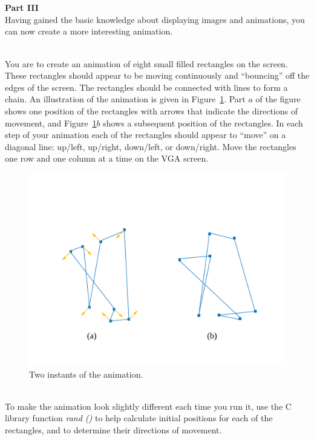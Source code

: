 \documentclass[epsfig,10pt,fullpage]{article}
\begin{document}
~\\
~\\
\noindent
{\bf Part III}
~\\

\noindent
Having gained the basic knowledge about displaying images and animations, you can now create 
a more interesting animation.

~\\
\noindent
You are to create an animation of eight small filled rectangles on the screen. These rectangles 
should appear to be moving continuously and ``bouncing'' off the edges of the screen. The 
rectangles should be connected with lines to form a chain. An illustration of the animation 
is given in Figure~\ref{fig:animation_example}. Part $a$ of the figure shows one position
of the rectangles with arrows that indicate the directions of movement, and 
Figure~\ref{fig:animation_example}$b$ shows a subsequent position of the rectangles. 
In each step of your animation each of the rectangles should appear to ``move'' on a diagonal 
line: up/left, up/right, down/left, or down/right. Move the rectangles one
row and one column at a time on the VGA screen.

\begin{figure}[h!]
   \begin{center}
       \includegraphics[scale = 0.5]{figures/fig_animation_example.pdf}
   \end{center}
   \caption{Two instants of the animation.}
	\label{fig:animation_example}
\end{figure}

~\\
\noindent
To make the animation look slightly different each time you run it, use the C library function 
{\it rand ()} to help calculate initial positions for each of the rectangles, and to determine 
their directions of movement. 
\end{document}
